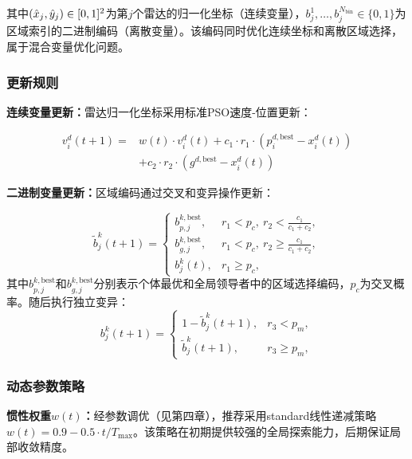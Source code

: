 其中$(\hat{x}_j, \hat{y}_j) \in [0,1]^2$为第$j$个雷达的归一化坐标（连续变量），$b_j^1, \ldots, b_j^{N_{\text{bin}}} \in \{0,1\}$为区域索引的二进制编码（离散变量）。该编码同时优化连续坐标和离散区域选择，属于混合变量优化问题。

\subsubsection{更新规则}

\textbf{连续变量更新：}雷达归一化坐标采用标准PSO速度-位置更新：

\begin{equation}
\begin{aligned}
v_i^d(t+1) ={}& w(t) \cdot v_i^d(t)
 + c_1 \cdot r_1 \cdot \left(p_i^{d,\text{best}} - x_i^d(t)\right) \\
& + c_2 \cdot r_2 \cdot \left(g^{d,\text{best}} - x_i^d(t)\right)
\end{aligned}
\label{eq:continuous_update}
\end{equation}

\textbf{二进制变量更新：}区域编码通过交叉和变异操作更新：

\begin{equation}
\tilde{b}_j^k(t+1) =
\begin{cases}
b_{p,j}^{k,\text{best}}, & r_1 < p_c,\ r_2 < \frac{c_1}{c_1+c_2}, \\
b_{g,j}^{k,\text{best}}, & r_1 < p_c,\ r_2 \geq \frac{c_1}{c_1+c_2}, \\
b_j^k(t), & r_1 \geq p_c,
\end{cases}
\label{eq:binary_crossover}
\end{equation}
其中$b_{p,j}^{k,\text{best}}$和$b_{g,j}^{k,\text{best}}$分别表示个体最优和全局领导者中的区域选择编码，$p_c$为交叉概率。随后执行独立变异：
\begin{equation}
b_j^k(t+1) =
\begin{cases}
1-\tilde{b}_j^k(t+1), & r_3 < p_m, \\
\tilde{b}_j^k(t+1), & r_3 \geq p_m,
\end{cases}
\label{eq:binary_mutation}
\end{equation}

\subsubsection{动态参数策略}

\textbf{惯性权重$w(t)$：}经参数调优（见第四章），推荐采用standard线性递减策略 $w(t) = 0.9 - 0.5 \cdot t/T_{\max}$。该策略在初期提供较强的全局探索能力，后期保证局部收敛精度。

